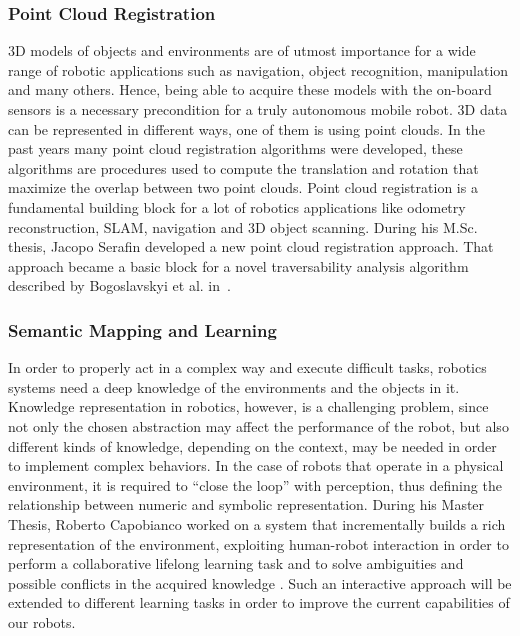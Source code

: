 \documentclass[conference]{IEEEtran}
\begin{document}
\subsubsection{Point Cloud Registration}
3D models of objects and environments are of utmost importance for a wide range of robotic applications such as navigation, object recognition, manipulation and many others. Hence, being able to acquire these models with the on-board sensors is a necessary precondition for a truly autonomous mobile robot. 3D data can be represented in different ways, one of them is using point clouds. In the past years many point cloud registration algorithms were developed, these algorithms are procedures used to compute the translation and rotation that maximize the overlap between two point clouds. Point cloud registration is a fundamental building block for a lot of robotics applications like odometry reconstruction, SLAM, navigation and 3D object scanning. During his M.Sc. thesis, Jacopo Serafin developed a new point cloud registration approach. That approach became a basic block for a novel traversability analysis algorithm described by Bogoslavskyi et al. in~\cite{bogoslavskyi-ECMR-13}.   

\subsubsection{Semantic Mapping and Learning}
In order to properly act in a complex way and execute difficult tasks, robotics systems need a deep knowledge of the environments and the objects in it. Knowledge representation in robotics, however, is a challenging problem, since not only the chosen abstraction may affect the performance of the robot, but also different kinds of knowledge, depending on the context, may be needed in order to implement complex behaviors. In the case of robots that operate in a physical environment, it is required to “close the loop” with perception, thus defining the relationship between numeric and symbolic representation. During his Master Thesis, Roberto Capobianco worked on a system that incrementally builds a rich representation of the environment, exploiting human-robot interaction in order to perform a collaborative lifelong learning task and to solve ambiguities and possible conflicts in the acquired knowledge \cite{bastianelli2013line}\cite{bastianelliBCGIN13}. Such an interactive approach will be extended to different learning tasks in order to improve the current capabilities of our robots.
\end{document}
